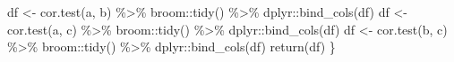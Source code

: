 \documentclass[a4paper]{tufte-handout}
\newenvironment{Shaded}{}{}
\newcommand{\FunctionTok}[1]{\textcolor[rgb]{0.02,0.16,0.49}{#1}}
\newcommand{\NormalTok}[1]{#1}
\newcommand{\OtherTok}[1]{\textcolor[rgb]{0.00,0.44,0.13}{#1}}
\newcommand{\SpecialCharTok}[1]{\textcolor[rgb]{0.25,0.44,0.63}{#1}}
\begin{document}
\begin{Shaded}
\begin{Highlighting}[numbers=left,,]
\NormalTok{  df }\OtherTok{\textless{}{-}} \FunctionTok{cor.test}\NormalTok{(a, b) }\SpecialCharTok{\%\textgreater{}\%}\NormalTok{ broom}\SpecialCharTok{::}\FunctionTok{tidy}\NormalTok{() }\SpecialCharTok{\%\textgreater{}\%}\NormalTok{ dplyr}\SpecialCharTok{::}\FunctionTok{bind\_cols}\NormalTok{(df)}
\NormalTok{  df }\OtherTok{\textless{}{-}} \FunctionTok{cor.test}\NormalTok{(a, c) }\SpecialCharTok{\%\textgreater{}\%}\NormalTok{ broom}\SpecialCharTok{::}\FunctionTok{tidy}\NormalTok{() }\SpecialCharTok{\%\textgreater{}\%}\NormalTok{ dplyr}\SpecialCharTok{::}\FunctionTok{bind\_cols}\NormalTok{(df)}
\NormalTok{  df }\OtherTok{\textless{}{-}} \FunctionTok{cor.test}\NormalTok{(b, c) }\SpecialCharTok{\%\textgreater{}\%}\NormalTok{ broom}\SpecialCharTok{::}\FunctionTok{tidy}\NormalTok{() }\SpecialCharTok{\%\textgreater{}\%}\NormalTok{ dplyr}\SpecialCharTok{::}\FunctionTok{bind\_cols}\NormalTok{(df)}
  \FunctionTok{return}\NormalTok{(df)}
\NormalTok{\}}
\end{Highlighting}
\end{Shaded}

\newpage
\end{document}
